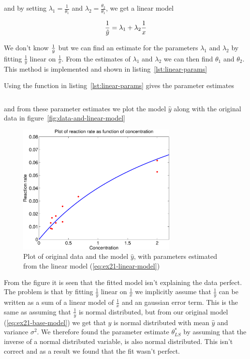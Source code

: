 and by setting $\lambda_1 = \frac{1}{\theta_1}$ and $\lambda_2 = \frac{\theta_2}{\theta_1}$, we get a linear model

\begin{equation}\label{eq:ex21-linear-model}
    \frac{1}{\hat{y}} = \lambda_1 + \lambda_2 \frac{1}{x}
\end{equation}

We don't know $\frac{1}{\hat{y}}$ but we can find an estimate for the parameters $\lambda_1$ and $\lambda_2$ by fitting $\frac{1}{y}$ linear on $\frac{1}{x}$. From the estimates of $\lambda_1$ and $\lambda_2$ we can then find $\theta_1$ and $\theta_2$. This method is implemented and shown in listing~\ref{lst:linear-params}



Using the function in listing~\ref{lst:linear-params} gives the parameter estimates

\begin{equation*}
    
\end{equation*}

and from these parameter estimates we plot the model $\hat{y}$ along with the original data in figure~\ref{fig:data-and-linear-model}

\begin{figure}[!ht]
    \centering
    \includegraphics[width=80mm]{../media/ex21-linear-model.pdf}
    \caption{Plot of original data and the model $\hat{y}$, with parameters estimated from the linear model (\ref{eq:ex21-linear-model})}
    \label{}
\end{figure}

From the figure it is seen that the fitted model isn't explaining the data perfect. The problem is that by fitting $\frac{1}{y}$ linear on $\frac{1}{x}$ we implicitly assume that $\frac{1}{y}$ can be written as a sum of a linear model of $\frac{1}{x}$ and an gaussian error term. This is the same as assuming that $\frac{1}{y}$ is normal distributed, but from our original model (\ref{eq:ex21-base-model}) we get that $y$ is normal distributed with mean $\hat{y}$ and variance $\sigma^2$. We therefore found the parameter estimate $\theta_{LS}^*$ by assuming that the inverse of a normal distributed variable, is also normal distributed. This isn't correct and as a result we found that the fit wasn't perfect.



